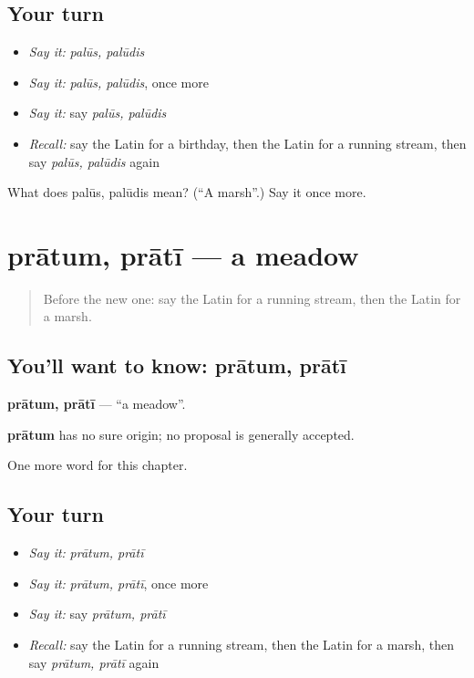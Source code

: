 \subsection*{Your turn}
\begin{itemize}
\raggedright
  \item \emph{Say it:} \emph{palūs, palūdis}
  \item \emph{Say it:} \emph{palūs, palūdis}, once more
  \item \emph{Say it:} say \emph{palūs, palūdis}
  \item \emph{Recall:} say the Latin for a birthday, then the Latin for a running stream, then say \emph{palūs, palūdis} again
\end{itemize}

\begin{tcolorbox}[breakable,colback=teal!4,colframe=teal!35!black,title={Before you move on}]
What does palūs, palūdis mean? (\textquotedblleft{}A marsh\textquotedblright{}.) Say it once more.
\end{tcolorbox}
\section[prātum, prātī]{prātum, prātī — a meadow}

\label{lesson:LA-C196-pratum}



\begin{quote}
Before the new one: say the Latin for a running stream, then the Latin for a marsh.
\end{quote}

\subsection*{You'll want to know: prātum, prātī}
\textbf{prātum, prātī} — \textquotedblleft{}a meadow\textquotedblright{}.

\begin{cousinweb}
\textbf{prātum} has no sure origin; no proposal is generally accepted.
\end{cousinweb}

\begin{grammarlens}[title={What you've built}]
One more word for this chapter.
\end{grammarlens}

\subsection*{Your turn}
\begin{itemize}
\raggedright
  \item \emph{Say it:} \emph{prātum, prātī}
  \item \emph{Say it:} \emph{prātum, prātī}, once more
  \item \emph{Say it:} say \emph{prātum, prātī}
  \item \emph{Recall:} say the Latin for a running stream, then the Latin for a marsh, then say \emph{prātum, prātī} again
\end{itemize}

